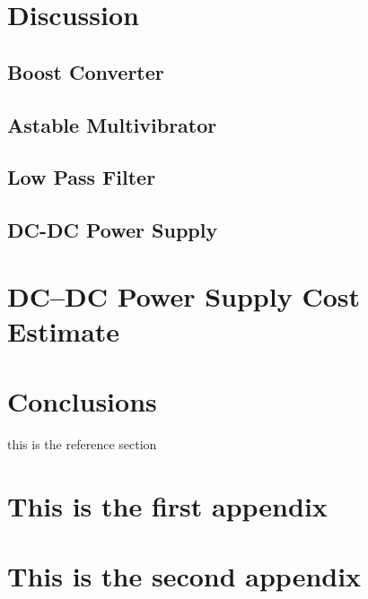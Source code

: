 \documentclass[11pt]{article}
\begin{document}
\section{Discussion}
\subsection{Boost Converter}
\subsection{Astable Multivibrator}
\subsection{Low Pass Filter}
\subsection{DC-DC Power Supply}


\section{DC--DC Power Supply Cost Estimate}


\section{Conclusions}

this is the reference section
\cite{ECE214_Lab7}
\cite{test}


\newpage
\begin{appendices}
\section{This is the first appendix}

\section{This is the second appendix}
\end{appendices}


\newpage
\end{document}
